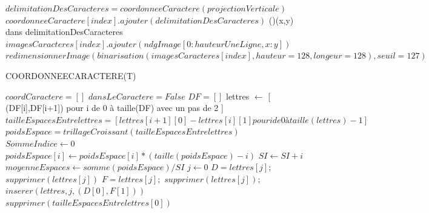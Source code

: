 \documentclass[a4paper]{article}
\begin{document}
\begin{algorithm}
{					$delimitationDesCaracteres = coordonneeCaractere(projectionVerticale)$\;
					\BlankLine
					$coordonneeCaractere[index].ajouter(delimitationDesCaracteres)$\;
    				\For(){(x,y) dans delimitationDesCaracteres}
					{
						$imagesCaracteres[index].ajouter(ndgImage[0:hauteurUneLigne, x:y])$\;
					}
					$redimensionnerImage(binarisation(imagesCaracteres[index],hauteur = 128,longeur = 128), seuil = 127)$\;
					\BlankLine
				}
			\end{algorithm}
			\newpage
			\begin{algorithm}
				\LinesNumbered
				\caption{COORDONNEECARACTERE(T)}\label{alg:coordcar}
				\BlankLine
				$coordCaractere = []$\;
				\BlankLine
				$dansLeCaractere = False$\;
				$DF = []$\;
				\BlankLine
				{
				}
				lettres $\gets$ [ (DF[i],DF[i+1]) pour i de 0 à taille(DF) avec un pas de 2 ]\;
				\BlankLine
				{
					$tailleEspacesEntrelettres = [ lettres[i+1][0]-lettres[i][1] pour i de 0 à taille(lettres)-1 ]$\;
					$poidsEspace = trillageCroissant(tailleEspacesEntrelettres)$\;
					\BlankLine
					$SommeIndice \gets 0$\;
					{
						$poidsEspace[i] \gets poidsEspace[i] * (taille(poidsEspace)-i)$\;
						$SI \gets SI + i$\;
					}
					$moyenneEspaces \gets somme(poidsEspace) / SI$\;
					$j \gets 0$\;
					{
						 {
							$D = lettres[j];$ $supprimer(lettres[j])$\;
							$F = lettres[j];$ $supprimer(lettres[j]);$\;
							$inserer(lettres,j,(D[0],F[1]))$\;
						}	
						$supprimer(tailleEspacesEntrelettres[0])$\;
					}
				}
			\end{algorithm}
\end{document}
